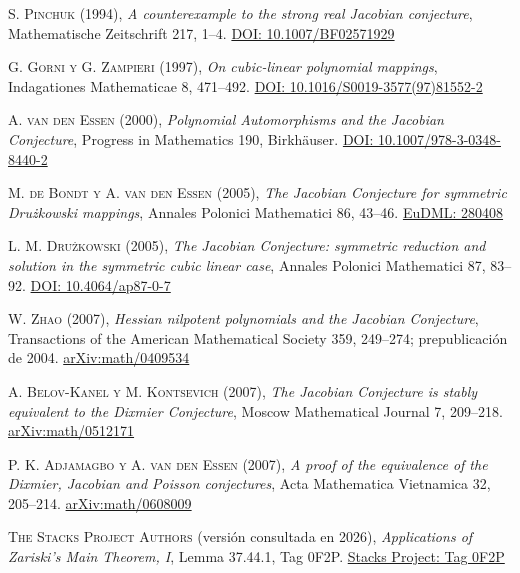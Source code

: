\documentclass[11pt]{article}
\theoremstyle{definition}
\theoremstyle{remark}
\newcommand{\bibauthor}[1]{\textsc{#1}}
\newcommand{\biblink}[2]{\href{#1}{\sffamily\footnotesize\color{teal!75!black}#2}}
\begin{document}
\begin{thebibliography}{99}
\bibauthor{S. Pinchuk} (1994),
\emph{A counterexample to the strong real Jacobian conjecture},
Mathematische Zeitschrift 217, 1--4.
\biblink{https://doi.org/10.1007/BF02571929}{DOI: 10.1007/BF02571929}

\bibauthor{G. Gorni y G. Zampieri} (1997),
\emph{On cubic-linear polynomial mappings},
Indagationes Mathematicae 8, 471--492.
\biblink{https://doi.org/10.1016/S0019-3577(97)81552-2}{DOI: 10.1016/S0019-3577(97)81552-2}

\bibauthor{A. van den Essen} (2000),
\emph{Polynomial Automorphisms and the Jacobian Conjecture},
Progress in Mathematics 190, Birkh\"auser.
\biblink{https://doi.org/10.1007/978-3-0348-8440-2}{DOI: 10.1007/978-3-0348-8440-2}

\bibauthor{M. de Bondt y A. van den Essen} (2005),
\emph{The Jacobian Conjecture for symmetric Dru\.zkowski mappings},
Annales Polonici Mathematici 86, 43--46.
\biblink{https://eudml.org/doc/280408}{EuDML: 280408}

\bibauthor{L. M. Dru\.zkowski} (2005),
\emph{The Jacobian Conjecture: symmetric reduction and solution in the
symmetric cubic linear case}, Annales Polonici Mathematici 87, 83--92.
\biblink{https://doi.org/10.4064/ap87-0-7}{DOI: 10.4064/ap87-0-7}

\bibauthor{W. Zhao} (2007),
\emph{Hessian nilpotent polynomials and the Jacobian Conjecture},
Transactions of the American Mathematical Society 359, 249--274;
prepublicaci\'on de 2004.
\biblink{https://arxiv.org/abs/math/0409534}{arXiv:math/0409534}

\bibauthor{A. Belov-Kanel y M. Kontsevich} (2007),
\emph{The Jacobian Conjecture is stably equivalent to the Dixmier
Conjecture}, Moscow Mathematical Journal 7, 209--218.
\biblink{https://arxiv.org/abs/math/0512171}{arXiv:math/0512171}

\bibauthor{P. K. Adjamagbo y A. van den Essen} (2007),
\emph{A proof of the equivalence of the Dixmier, Jacobian and Poisson
conjectures}, Acta Mathematica Vietnamica 32, 205--214.
\biblink{https://arxiv.org/abs/math/0608009}{arXiv:math/0608009}

\bibauthor{The Stacks Project Authors} (versi\'on consultada en 2026),
\emph{Applications of Zariski's Main Theorem, I}, Lemma 37.44.1, Tag 0F2P.
\biblink{https://stacks.math.columbia.edu/tag/0F2P}{Stacks Project: Tag 0F2P}


\end{thebibliography}
\end{document}
